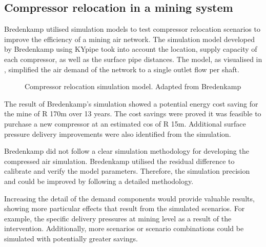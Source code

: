 \subsection{Compressor relocation in a mining system}
 Bredenkamp \cite{Bredenkamp2013Masters} utilised simulation models to test compressor relocation scenarios to improve the efficiency of a mining air network.  The simulation model developed by Bredenkamp using KYpipe took into account the location, supply capacity of each compressor, as well as the surface pipe distances. The model, as visualised in , simplified the air demand of the network to a single outlet flow per shaft.
\par
\begin{figure}[!htbp]
	\centering
	\caption[Compressor relocation simulation model]{Compressor relocation simulation model. Adapted from Bredenkamp \cite{Bredenkamp2013Masters}}
	\label{fig: bredenkamp model}
\end{figure}
The result of Bredenkamp's simulation showed a potential energy cost saving for the mine of R 170m over 13 years. The cost savings were proved it was feasible to purchase a new compressor at an estimated cos of R 15m. Additional surface pressure delivery improvements were also identified from the simulation.
\par 
Bredenkamp did not follow a clear simulation methodology for developing the compressed air simulation. Bredenkamp utilised the residual difference to calibrate and verify the model parameters. Therefore, the simulation precision and could be improved by following a detailed methodology.
\par 
Increasing the detail of the demand components would provide valuable results, showing more particular effects that result from the simulated scenarios. For example, the specific delivery pressures at mining level as a result of the intervention. Additionally, more scenarios or scenario combinations could be simulated with potentially greater savings.

